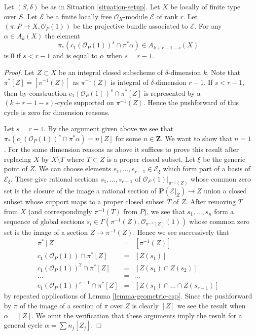 \begin{lemma}
\label{lemma-cap-projective-bundle}
Let $(S, \delta)$ be as in Situation \ref{situation-setup}.
Let $X$ be locally of finite type over $S$.
Let $\mathcal{E}$ be a finite locally free $\mathcal{O}_X$-module
$\mathcal{E}$ of rank $r$. Let $(\pi : P \to X, \mathcal{O}_P(1))$
be the projective bundle associated to $\mathcal{E}$.
For any $\alpha \in A_k(X)$ the element
$$
\pi_*\left(
c_1(\mathcal{O}_P(1))^s \cap \pi^*\alpha
\right)
\in
A_{k + r - 1 - s}(X)
$$
is $0$ if $s < r - 1$ and is equal to $\alpha$ when $s = r - 1$.
\end{lemma}

\begin{proof}
Let $Z \subset X$ be an integral closed subscheme of $\delta$-dimension $k$.
Note that $\pi^*[Z] = [\pi^{-1}(Z)]$ as $\pi^{-1}(Z)$ is integral of
$\delta$-dimension $r - 1$.
If $s < r - 1$, then by construction
$c_1(\mathcal{O}_P(1))^s \cap \pi^*[Z]$
is represented by a $(k + r - 1 - s)$-cycle supported on
$\pi^{-1}(Z)$. Hence the pushforward of this cycle
is zero for dimension reasons.

\medskip\noindent
Let $s = r - 1$. By the argument given above we see that
$\pi_*(c_1(\mathcal{O}_P(1))^s \cap \pi^*\alpha) = n [Z]$
for some $n \in \mathbf{Z}$. We want to show that $n = 1$.
For the same dimension reasons
as above it suffices to prove this result after replacing $X$ by
$X \setminus T$ where $T \subset Z$ is a proper closed subset.
Let $\xi$ be the generic point of $Z$.
We can choose elements $e_1, \ldots, e_{r - 1} \in \mathcal{E}_\xi$
which form part of a basis of $\mathcal{E}_\xi$.
These give rational sections $s_1, \ldots, s_{r - 1}$
of $\mathcal{O}_P(1)|_{\pi^{-1}(Z)}$ whose common zero set
is the closure of the image a rational section of
$\mathbf{P}(\mathcal{E}|_Z) \to Z$ union a closed subset whose
support maps to a proper closed subset $T$ of $Z$.
After removing $T$ from $X$ (and correspondingly $\pi^{-1}(T)$
from $P$), we see that $s_1, \ldots, s_n$ form a sequence
of global sections
$s_i \in \Gamma(\pi^{-1}(Z), \mathcal{O}_{\pi^{-1}(Z)}(1))$
whose common zero set is the image of a section $Z \to \pi^{-1}(Z)$.
Hence we see successively that
\begin{eqnarray*}
\pi^*[Z] & = & [\pi^{-1}(Z)] \\
c_1(\mathcal{O}_P(1)) \cap \pi^*[Z] & = & [Z(s_1)] \\
c_1(\mathcal{O}_P(1))^2 \cap \pi^*[Z] & = & [Z(s_1) \cap Z(s_2)] \\
\ldots & = & \ldots \\
c_1(\mathcal{O}_P(1))^{r - 1} \cap \pi^*[Z] & = &
[Z(s_1) \cap \ldots \cap Z(s_{r - 1})]
\end{eqnarray*}
by repeated applications of Lemma \ref{lemma-geometric-cap}.
Since the pushforward by $\pi$ of the image of a
section of $\pi$ over $Z$ is clearly $[Z]$ we see the result
when $\alpha = [Z]$. We omit the verification that these
arguments imply the result for a general cycle $\alpha = \sum n_j [Z_j]$.
\end{proof}

